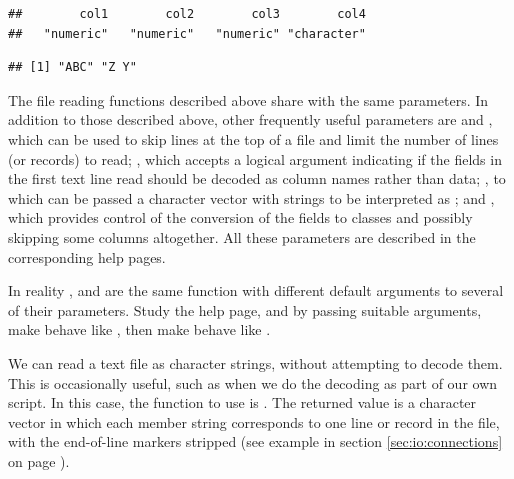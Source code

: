 \documentclass[krantz2]{krantz}\usepackage{knitr}
\begin{document}
\begin{knitrout}\footnotesize
{}\color{fgcolor}\begin{kframe}
\begin{alltt}
\end{alltt}
\begin{verbatim}
##        col1        col2        col3        col4
##   "numeric"   "numeric"   "numeric" "character"
\end{verbatim}
\begin{alltt}
\hlstd{from_fwf_a.df[[}\hlstd{]]}
\end{alltt}
\begin{verbatim}
## [1] "ABC" "Z Y"
\end{verbatim}
\end{kframe}
\end{knitrout}

\begin{explainbox}
  The file reading functions described above share with  the same parameters. In addition to those described above, other frequently useful parameters are  and , which can be used to skip lines at the top of a file and limit the number of lines (or records) to read; , which accepts a logical argument indicating if the fields in the first text line read should be decoded as column names rather than data; , to which can be passed a character vector with strings to be interpreted as ; and , which provides control of the conversion of the fields to \Rlang classes and possibly skipping some columns altogether. All these parameters are described in the corresponding help pages.
\end{explainbox}

\begin{playground}
In reality  ,  and  are the same function with different default arguments to several of their parameters. Study the help page, and by passing suitable arguments, make  behave like , then make  behave like .
\end{playground}

\begin{explainbox}
We can read a text file as character strings, without attempting to decode them. This is occasionally useful, such as when we do the decoding as part of our own script. In this case, the function to use is . The returned value is a character vector in which each member string corresponds to one line or record in the file, with the end-of-line markers stripped (see example in section \ref{sec:io:connections} on page \pageref{sec:io:connections}).
\end{explainbox}
\end{document}
